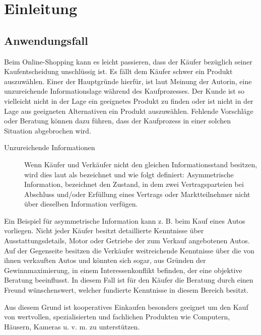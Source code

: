 
\chapter{Einleitung}


\section{Anwendungsfall}

Beim Online-Shopping kann es leicht passieren, dass der Käufer bezüglich seiner Kaufentscheidung unschlüssig ist. Es fällt dem Käufer schwer ein Produkt auszuwählen. Einer der Hauptgründe hierfür, ist laut Meinung der Autorin, eine unzureichende Informationslage während des Kaufprozesses. Der Kunde ist so vielleicht nicht in der Lage ein geeignetes Produkt zu finden oder ist nicht in der Lage aus geeigneten Alternativen ein Produkt auszuwählen. Fehlende Vorschläge oder Beratung können dazu führen, dass der Kaufprozess in einer solchen Situation abgebrochen wird.

\begin{description}
\item[Unzureichende Informationen] Wenn Käufer und Verkäufer nicht den gleichen Informationsstand besitzen, wird dies laut \textcite{akerlof:lemons} als  bezeichnet und wie folgt definiert: \glqq{}Asymmetrische Information, bezeichnet den Zustand, in dem zwei Vertragsparteien bei Abschluss und/oder Erfüllung eines Vertrags oder Marktteilnehmer nicht über dieselben Information verfügen.\grqq{}
\end{description}

Ein Beispiel für asymmetrische Information kann z. B. beim Kauf eines Autos vorliegen. Nicht jeder Käufer besitzt detaillierte Kenntnisse über Ausstattungsdetails, Motor oder Getriebe der zum Verkauf angebotenen Autos. Auf der Gegenseite besitzen die Verkäufer weitreichende Kenntnisse über die von ihnen verkauften Autos und könnten sich sogar, aus Gründen der Gewinnmaximierung, in einem Interessenkonflikt befinden, der eine objektive Beratung beeinflusst. In diesem Fall ist für den Käufer die Beratung durch einen Freund wünschenswert, welcher fundierte Kenntnisse in diesem Bereich besitzt.


Aus diesem Grund ist kooperatives Einkaufen besonders geeignet um den Kauf von wertvollen, spezialisierten und fachlichen Produkten wie Computern, Häusern, Kameras u. v. m. zu unterstützen.

